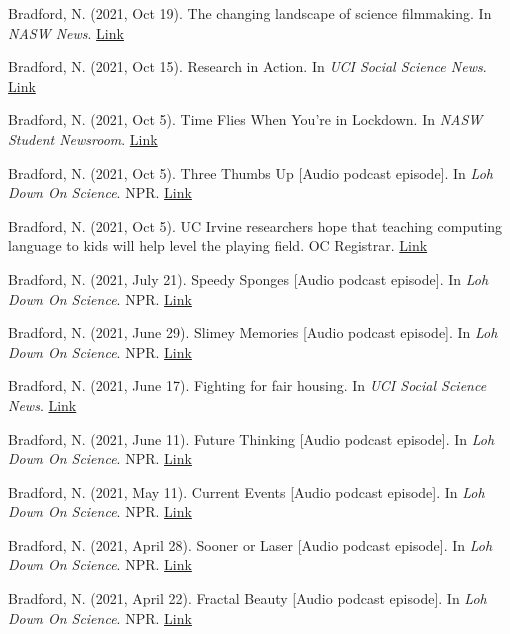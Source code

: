 \documentclass[margin, 10pt]{res} %
\begin{document}
\begin{resume}
Bradford, N. (2021, Oct 19). The changing landscape of science filmmaking. In {\sl NASW News}. \href{https://www.nasw.org/article/changing-landscape-science-filmmaking}{Link} 

Bradford, N. (2021, Oct 15). Research in Action. In {\sl UCI Social Science News}. \href{https://www.socsci.uci.edu/newsevents/news/2021/2021-10-15-gillooly.php}{Link} 

Bradford, N. (2021, Oct 5). Time Flies When You're in Lockdown. In {\sl NASW Student Newsroom}. \href{https://nasw.org/article/time-flies-when-youre-lockdown}{Link}

Bradford, N. (2021, Oct 5). Three Thumbs Up [Audio podcast episode]. In {\sl Loh Down On Science}. NPR. \href{https://lohdownonscience.com/three-thumbs-up/}{Link}

Bradford, N. (2021, Oct 5). UC Irvine researchers hope that teaching computing language to kids will help level the playing field. OC Registrar. \href{https://www.ocregister.com/2021/10/05/uc-irvine-researchers-hope-that-teaching-computing-language-to-kids-will-help-level-the-playing-field/}{Link}

Bradford, N. (2021, July 21). Speedy Sponges [Audio podcast episode]. In {\sl Loh Down On Science}. NPR. \href{https://lohdownonscience.com/speedy-sponges/}{Link}

Bradford, N. (2021, June 29). Slimey Memories [Audio podcast episode]. In {\sl Loh Down On Science}. NPR. \href{https://lohdownonscience.com/slimey-memories/}{Link}

Bradford, N. (2021, June 17). Fighting for fair housing. In {\sl UCI Social Science News}. \href{https://www.socsci.uci.edu/newsevents/news/2021/2021-06-17-schmidt-haynes-foundation.php}{Link}

Bradford, N. (2021, June 11). Future Thinking [Audio podcast episode]. In {\sl Loh Down On Science}. NPR. \href{https://lohdownonscience.com/future-thinking/}{Link} 

Bradford, N. (2021, May 11). Current Events [Audio podcast episode]. In {\sl Loh Down On Science}. NPR. \href{https://lohdownonscience.com/current-events/}{Link}

Bradford, N. (2021, April 28). Sooner or Laser [Audio podcast episode]. In {\sl Loh Down On Science}. NPR. \href{https://lohdownonscience.com/sooner-or-laser/}{Link}

Bradford, N. (2021, April 22). Fractal Beauty [Audio podcast episode]. In {\sl Loh Down On Science}. NPR. \href{https://lohdownonscience.com/fractal-beauty/}{Link}


\end{resume}
\end{document}
